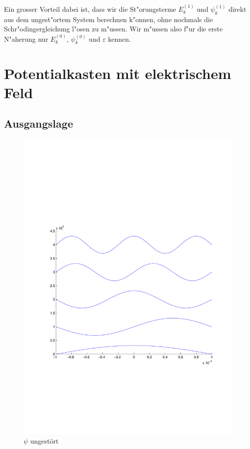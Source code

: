 \begin{refsection}
Ein grosser Vorteil dabei ist,
dass wir die St"orungsterme $E_k^{(1)}$ und $\psi_k^{(1)}$
direkt aus dem ungest"ortem System berechnen k"onnen,
ohne nochmals die Schr"odingergleichung l"osen zu m"ussen.
Wir m"ussen also f"ur die erste N"aherung nur $E_k^{(0)}$,
$\psi_k^{(0)}$ und $\varepsilon$ kennen.




\section{Potentialkasten mit elektrischem Feld}

\subsection{Ausgangslage}

\begin{figure}
 \centering
 \includegraphics[width=12cm,clip=true,trim=2cm 7cm 1cm 8cm]{efeld/Psi_ungestoert.pdf}
 \caption{$\psi$ ungest\"ort}
 \label{abb:efeld_psi_ungestoert}
\end{figure}


\end{refsection}
